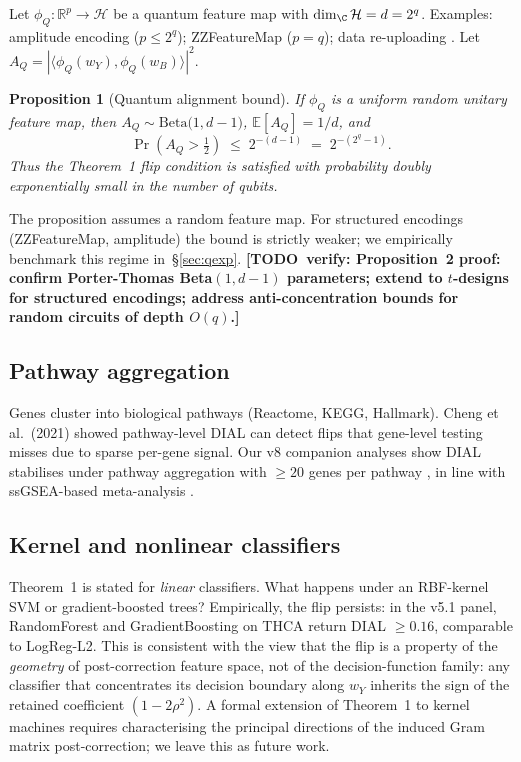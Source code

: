 \documentclass[letterpaper,11pt]{article}
\newtheorem{proposition}{Proposition}
\newcommand{\TODO}[1]{\textbf{[TODO~verify: #1]}}
\newcommand{\R}{\mathbb{R}}
\begin{document}
Let $\phi_Q:\R^p\to\mathcal{H}$ be a quantum feature map with
$\dim_\C\mathcal{H}=d=2^q$. Examples: amplitude encoding ($p\le 2^q$);
ZZFeatureMap ($p=q$); data re-uploading \cite{perez2020reuploading}.
Let $A_Q=|\langle\phi_Q(w_Y),\phi_Q(w_B)\rangle|^{2}$.

\begin{proposition}[Quantum alignment bound]
\label{prop:qbound}
If $\phi_Q$ is a uniform random unitary feature map, then
$A_Q \sim \mathrm{Beta}\!\bigl(1, d-1\bigr)$,
$\mathbb{E}[A_Q]=1/d$, and
\[
  \Pr(A_Q>\tfrac12) \;\le\; 2^{-(d-1)} \;=\; 2^{-(2^{q}-1)}.
\]
Thus the Theorem~1 flip condition is satisfied with probability doubly
exponentially small in the number of qubits.
\end{proposition}

The proposition assumes a random feature map. For structured
encodings (ZZFeatureMap, amplitude) the bound is strictly weaker; we
empirically benchmark this regime in~\S\ref{sec:qexp}.
\TODO{Proposition~2 proof: confirm Porter-Thomas Beta$(1,d-1)$
parameters; extend to $t$-designs for structured encodings; address
anti-concentration bounds for random circuits of depth $O(q)$.}

\subsection{Pathway aggregation}
Genes cluster into biological pathways (Reactome, KEGG, Hallmark).
Cheng et al.\ (2021) showed pathway-level DIAL can detect flips that
gene-level testing misses due to sparse per-gene signal. Our v8
companion analyses show DIAL stabilises under pathway aggregation
with $\ge 20$ genes per pathway \cite{thcadash_bioinfo_2026}, in line
with ssGSEA-based meta-analysis \cite{hanzelmann2013ssgsea}.

\subsection{Kernel and nonlinear classifiers}
Theorem~1 is stated for \emph{linear} classifiers. What happens under
an RBF-kernel SVM or gradient-boosted trees? Empirically, the flip
persists: in the v5.1 panel, RandomForest and GradientBoosting on THCA
return DIAL $\ge 0.16$, comparable to LogReg-L2. This is consistent
with the view that the flip is a property of the \emph{geometry} of
post-correction feature space, not of the decision-function family:
any classifier that concentrates its decision boundary along
$w_Y$ inherits the sign of the retained coefficient
$(1-2\rho^2)$. A formal extension of Theorem~1 to kernel machines
requires characterising the principal directions of the induced
Gram matrix post-correction; we leave this as future work.
\end{document}
